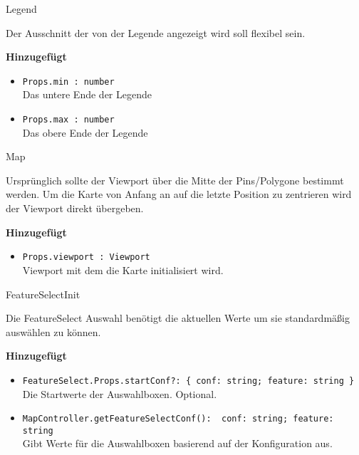 \begin{Change}{Legend}
    
    Der Ausschnitt der von der Legende angezeigt wird soll flexibel sein.

    \bigskip
    \textbf{Hinzugefügt}
    \begin{itemize}
        \item \texttt{Props.min : number}
        \\ Das untere Ende der Legende
        \item \texttt{Props.max : number}
        \\ Das obere Ende der Legende
    \end{itemize}

\end{Change}

\begin{Change}{Map}
    
    Ursprünglich sollte der Viewport über die Mitte der Pins/Polygone bestimmt werden.
    Um die Karte von Anfang an auf die letzte Position zu zentrieren wird der Viewport direkt übergeben.
    
    \bigskip
    \textbf{Hinzugefügt}
    \begin{itemize}
        \item \texttt{Props.viewport : Viewport}
        \\ Viewport mit dem die Karte initialisiert wird.
    \end{itemize}

\end{Change}

\begin{Change}{FeatureSelectInit}
    
    Die FeatureSelect Auswahl benötigt die aktuellen Werte um sie standardmäßig auswählen zu können.
    
    \bigskip
    \textbf{Hinzugefügt}
    \begin{itemize}
        \item \texttt{FeatureSelect.Props.startConf?: \{ conf: string; feature: string \}}
        \\ Die Startwerte der Auswahlboxen. Optional.
        \item \texttt{MapController.getFeatureSelectConf(): { conf: string; feature: string }}
        \\ Gibt Werte für die Auswahlboxen basierend auf der Konfiguration aus.
    \end{itemize}

\end{Change}

